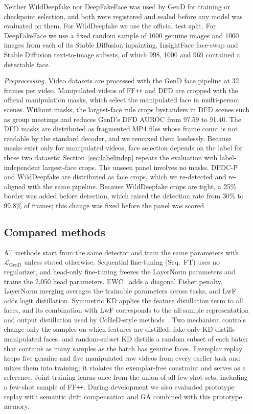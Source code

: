 \documentclass[journal]{IEEEtran}
\newcommand{\ffpp}{FF\texttt{++}}
\begin{document}
Neither WildDeepfake nor DeepFakeFace was used by GenD for training or checkpoint selection, and both were registered and sealed before any model was evaluated on them. For WildDeepfake we use the official test split. For DeepFakeFace we use a fixed random sample of 1000 genuine images and 1000 images from each of its Stable Diffusion inpainting, InsightFace face-swap and Stable Diffusion text-to-image subsets, of which 998, 1000 and 969 contained a detectable face.

\textit{Preprocessing.} Video datasets are processed with the GenD face pipeline at 32 frames per video. Manipulated videos of \ffpp{} and DFD are cropped with the official manipulation masks, which select the manipulated face in multi-person scenes. Without masks, the largest-face rule crops bystanders in DFD scenes such as group meetings and reduces GenD's DFD AUROC from 97.59 to 91.40. The DFD masks are distributed as fragmented MP4 files whose frame count is not readable by the standard decoder, and we remuxed them losslessly. Because masks exist only for manipulated videos, face selection depends on the label for these two datasets; Section~\ref{sec:labelindep} repeats the evaluation with label-independent largest-face crops. The unseen panel involves no masks. DFDC-P and WildDeepfake are distributed as face crops, which we re-detected and re-aligned with the same pipeline. Because WildDeepfake crops are tight, a 25\% border was added before detection, which raised the detection rate from 30\% to 99.8\% of frames; this change was fixed before the panel was scored.

\subsection{Compared methods}
All methods start from the same detector and train the same parameters with $\mathcal{L}_{\mathrm{GenD}}$ unless stated otherwise. Sequential fine-tuning (Seq.\ FT) uses no regularizer, and head-only fine-tuning freezes the LayerNorm parameters and trains the 2{,}050 head parameters. EWC~\cite{kirkpatrick2017ewc} adds a diagonal Fisher penalty, LayerNorm merging averages the trainable parameters across tasks, and LwF~\cite{li2018lwf} adds logit distillation. Symmetric KD applies the feature distillation term to all faces, and its combination with LwF corresponds to the all-sample representation and output distillation used by CoReD-style methods~\cite{kim2021cored}. Two mechanism controls change only the samples on which features are distilled: fake-only KD distills manipulated faces, and random-subset KD distills a random subset of each batch that contains as many samples as the batch has genuine faces. Exemplar replay keeps five genuine and five manipulated raw videos from every earlier task and mixes them into training; it violates the exemplar-free constraint and serves as a reference. Joint training learns once from the union of all few-shot sets, including a few-shot sample of \ffpp{}. During development we also evaluated prototype replay with semantic drift compensation and GA combined with this prototype memory.
\end{document}
